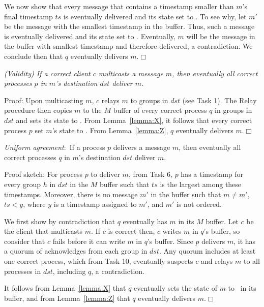 We now show that every message that contains a timestamp smaller than $m$'s final timestamp $ts$ is eventually delivered and its state set to \done.
To see why, let $m'$ be the message with the smallest timestamp in the buffer.
Thus, such a message is eventually delivered and its state set to \ordered.
Eventually, $m$ will be the message in the buffer with smallest timestamp and therefore delivered, a contradiction.
We conclude then that $q$ eventually delivers $m$.\hfill$\Box$


\vspace{2mm}
\setcounter{proposition}{1}
\begin{proposition}
\textit{(Validity) If a correct client $c$ multicasts a message $m$, then eventually all correct processes $p$ in $m$'s destination $dst$ deliver $m$.}
\end{proposition}
\noindent
{\sc Proof:} 
Upon multicasting $m$, $c$ relays $m$ to groups in $dst$ (see Task 1).
The Relay procedure then copies $m$ to the $M$ buffer of every correct process $q$ in groups in $dst$ and sets its state to \mcast.
From Lemma~\ref{lemma:X}, it follows that every correct process $p$ set $m$'s state to \ordered.
From Lemma~\ref{lemma:Z}, $q$ eventually delivers $m$.\hfill$\Box$


\setcounter{proposition}{4}
\begin{proposition}
\textit{Uniform agreement}:~If a process $p$ delivers a message $m$, then eventually all correct processes $q$ in $m$'s destination $dst$ deliver $m$.
\end{proposition}
\noindent
{\sc Proof sketch:} 
For process $p$ to deliver $m$, from Task 6, $p$ has a timestamp for every group $h$ in $dst$ in the $M$ buffer such that $ts$ is the largest among these timestamps.
Moreover, there is no message $m'$ in the buffer such that $m \neq m'$, $ts < y$, where $y$ is a timestamp assigned to $m'$, and $m'$ is not ordered.

We first show by contradiction that $q$ eventually has $m$ in its $M$ buffer.
Let $c$ be the client that multicasts $m$.
If $c$ is correct then, $c$ writes $m$ in $q$'s buffer, so consider that $c$ fails before it can write $m$ in $q$'s buffer.
Since $p$ delivers $m$, it has a quorum of acknowledges from each group in $dst$.
Any quorum includes at least one correct process, which from Task 10, eventually suspects $c$ and relays $m$ to all processes in $dst$, including $q$, a contradiction.

It follows from Lemma~\ref{lemma:X} that $q$ eventually sets the state of $m$ to \ordered\ in its buffer, and 
from Lemma~\ref{lemma:Z} that $q$ eventually delivers $m$.\hfill$\Box$


